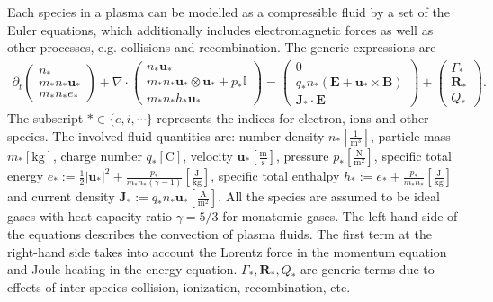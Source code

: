 \documentclass{article}
\begin{document}
Each species in a plasma can be modelled as a compressible fluid by a set of the Euler equations, which additionally includes electromagnetic forces as well as other processes, e.g. collisions and recombination. The generic expressions are
\begin{align} \label{equ:euler_}
    \partial_t
    \begin{pmatrix}
    n_* \\
    m_*n_* \mathbf{u}_* \\
    m_*n_* e_*
    \end{pmatrix}
    + \nabla \cdot
    \begin{pmatrix}
    n_* \mathbf{u}_* \\
    m_*n_* \mathbf{u}_* \otimes \mathbf{u}_* + p_*\mathbb{I} \\
    m_*n_* h_* \mathbf{u}_*
    \end{pmatrix}
    =
    \begin{pmatrix}
    0 \\
    q_*n_*(\mathbf{E} + \mathbf{u}_* \times \mathbf{B}) \\
    \mathbf{J}_* \cdot \mathbf{E}
    \end{pmatrix}
    +
    \begin{pmatrix}
    \Gamma_* \\
    \mathbf{R}_* \\
    Q_*
    \end{pmatrix}.
\end{align}
The subscript $*\in \{e, i, \cdots\}$ represents the indices for electron, ions and other species. The involved fluid quantities are: number density $n_*[\frac{1}{\text{m}^3}]$, particle mass $m_*[\text{kg}]$,  charge number $q_*[\text{C}]$, velocity $\mathbf{u}_*[\frac{\text{m}}{\text{s}}]$, pressure $p_*[\frac{\text{N}}{\text{m}^2}]$, specific total energy $e_* := \frac{1}{2}|\mathbf{u}_*|^2 + \frac{p_*}{m_*n_*(\gamma - 1)}[\frac{\text{J}}{\text{kg}}]$, specific total enthalpy $h_* := e_* + \frac{p_*}{m_*n_*}[\frac{\text{J}}{\text{kg}}]$ and current density $\mathbf{J}_* := q_*n_*\mathbf{u}_*[\frac{\text{A}}{\text{m}^2}]$. All the species are assumed to be ideal gases with heat capacity ratio $\gamma=5/3$ for monatomic gases. The left-hand side of the equations describes the convection of plasma fluids. The first term at the right-hand side takes into account the Lorentz force in the momentum equation and Joule heating in the energy equation. $\Gamma_*, \mathbf{R}_*, Q_*$ are generic terms due to effects of inter-species collision, ionization, recombination, etc. 
\end{document}
